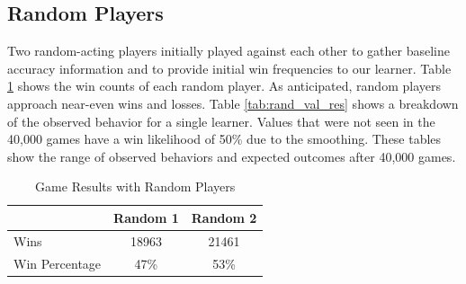 \documentclass[12pt,pdftex]{article}
\begin{document}
\subsection{Random Players}
Two random-acting players initially played against each other to gather baseline accuracy information and to provide initial win frequencies to our learner. 
Table \ref{tab:rand_res} shows the win counts of each random player. 
As anticipated, random players approach near-even wins and losses.
Table \ref{tab:rand_val_res} shows a breakdown of the observed behavior for a single learner. 
Values that were not seen in the 40,000 games have a win likelihood of 50\% due to the smoothing.
These tables show the range of observed behaviors and expected outcomes after 40,000 games.

\begin{table}[hb]
\centering
\begin{tabular}{| l | c | c |}
	\hline
& \textbf{Random 1} & \textbf{Random 2}\\
\hline
Wins & 18963 & 21461\\ %
	\hline
Win Percentage & 47\% &53\% \\
\hline
\end{tabular}
\caption{Game Results with Random Players}
\label{tab:rand_res}
\end{table}
\end{document}
